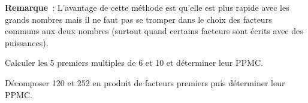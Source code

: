 \begin{methode*1}
\vspace{2em}

\textcolor{H1}{\textbf{Remarque}} :
L'avantage de cette méthode est qu'elle est plus rapide avec les grands nombres mais il ne faut pas se tromper dans le choix des facteurs communs aux deux nombres (surtout quand certains facteurs sont écrits avec des puissances).

 

 \exercice
Calculer les 5 premiers multiples de 6 et 10 et déterminer leur PPMC.
 
\vspace{5em}


 \exercice
Décomposer 120 et 252 en produit de facteurs premiers puis déterminer leur PPMC.

\vspace{5em}


 \end{methode*1}
 
